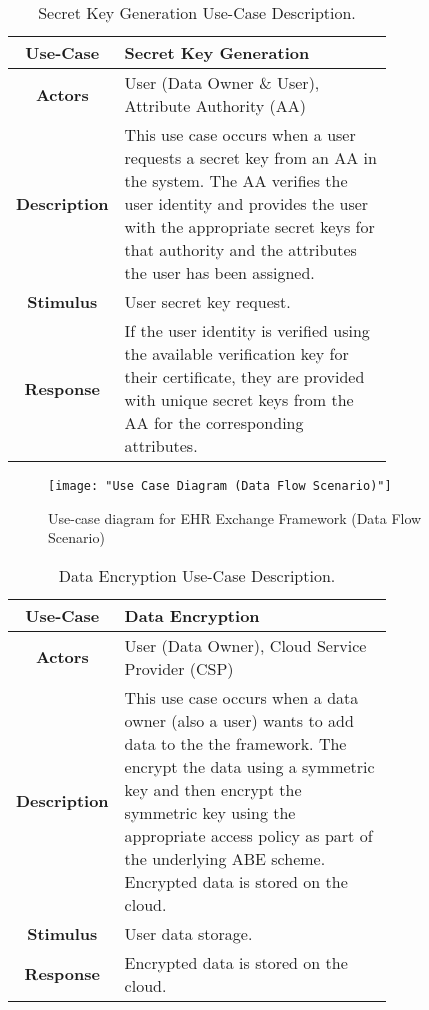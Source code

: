 \begin{table}[]
	\centering
	\begin{tabular}{|c|p{0.75\linewidth}|}
		\hline
		\textbf{Use-Case}    & Secret Key Generation                                   \\ \hline
		\textbf{Actors}      & User (Data Owner \& User), Attribute Authority (AA)                        \\ \hline
		\textbf{Description} & This use case occurs when a user requests a secret key from an AA in the system. The AA verifies the user identity and provides the user with the appropriate secret keys for that authority and the attributes the user has been assigned. \\ \hline
		\textbf{Stimulus}    & User secret key request.                    \\ \hline
		\textbf{Response}    & If the user identity is verified using the available verification key for their certificate, they are provided with unique secret keys from the AA for the corresponding attributes.             \\ \hline
	\end{tabular}
	\caption{Secret Key Generation Use-Case Description.}
	\label{tab:use_case_skgen}
\end{table}


\begin{figure}[]
\centering
\texttt{[image: "Use Case Diagram (Data Flow Scenario)"]}
\caption{Use-case diagram for EHR Exchange Framework (Data Flow Scenario)}
\label{fig:use_case_df}
\end{figure}


\begin{table}[]
	\centering
	\begin{tabular}{|c|p{0.75\linewidth}|}
		\hline
		\textbf{Use-Case}    & Data Encryption                                   \\ \hline
		\textbf{Actors}      & User (Data Owner), Cloud Service Provider (CSP)                        \\ \hline
		\textbf{Description} & This use case occurs when a data owner (also a user) wants to add data to the the framework. The encrypt the data using a symmetric key and then encrypt the symmetric key using the appropriate access policy as part of the underlying ABE scheme. Encrypted data is stored on the cloud. \\ \hline
		\textbf{Stimulus}    & User data storage.                    \\ \hline
		\textbf{Response}    & Encrypted data is stored on the cloud.            \\ \hline
	\end{tabular}
	\caption{Data Encryption Use-Case Description.}
	\label{tab:use_case_enc}
\end{table}

